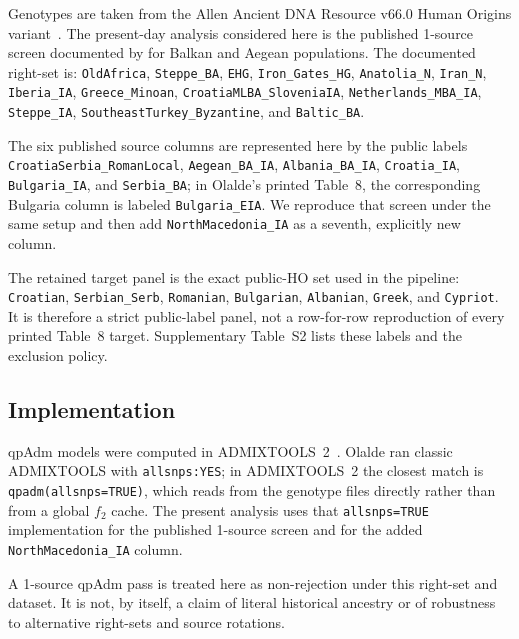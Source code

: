\documentclass[11pt]{article}
\begin{document}
\begin{sloppypar}
Genotypes are taken from the Allen Ancient DNA Resource v66.0 Human Origins
variant~\citep{AADRv66}. The present-day analysis considered here is the
published 1-source screen documented by \citet{Olalde2023} for Balkan and
Aegean populations. The documented right-set is:
\nolinkurl{OldAfrica}, \nolinkurl{Steppe_BA}, \nolinkurl{EHG},
\nolinkurl{Iron_Gates_HG}, \nolinkurl{Anatolia_N}, \nolinkurl{Iran_N},
\nolinkurl{Iberia_IA}, \nolinkurl{Greece_Minoan},
\nolinkurl{CroatiaMLBA_SloveniaIA}, \nolinkurl{Netherlands_MBA_IA},
\nolinkurl{Steppe_IA}, \nolinkurl{SoutheastTurkey_Byzantine}, and
\nolinkurl{Baltic_BA}.

The six published source columns are represented here by the public labels
\nolinkurl{CroatiaSerbia_RomanLocal}, \nolinkurl{Aegean_BA_IA},
\nolinkurl{Albania_BA_IA}, \nolinkurl{Croatia_IA},
\nolinkurl{Bulgaria_IA}, and \nolinkurl{Serbia_BA}; in Olalde's printed
Table~8, the corresponding Bulgaria column is labeled \nolinkurl{Bulgaria_EIA}.
We reproduce that screen under the same setup and then add
\nolinkurl{NorthMacedonia_IA} as a seventh, explicitly new column.

The retained target panel is the exact public-HO set used in the pipeline:
\texttt{Croatian}, \texttt{Serbian\_Serb}, \texttt{Romanian},
\texttt{Bulgarian}, \texttt{Albanian}, \texttt{Greek}, and
\texttt{Cypriot}. It is therefore a strict public-label panel, not a row-for-row
reproduction of every printed Table~8 target. Supplementary Table~S2 lists
these labels and the exclusion policy.
\end{sloppypar}

\subsection{Implementation}

\begin{sloppypar}
qpAdm models were computed in ADMIXTOOLS~2~\citep{Maier2023}. Olalde ran
classic ADMIXTOOLS with \nolinkurl{allsnps:YES}; in ADMIXTOOLS~2 the closest
match is \nolinkurl{qpadm(allsnps=TRUE)}, which reads from the genotype files
directly rather than from a global $f_2$ cache. The present analysis uses
that \nolinkurl{allsnps=TRUE} implementation for the published 1-source screen
and for the added \nolinkurl{NorthMacedonia_IA} column.

A 1-source qpAdm pass is treated here as non-rejection under this right-set and
dataset. It is not, by itself, a claim of literal historical ancestry or of
robustness to alternative right-sets and source rotations.
\end{sloppypar}
\end{document}
